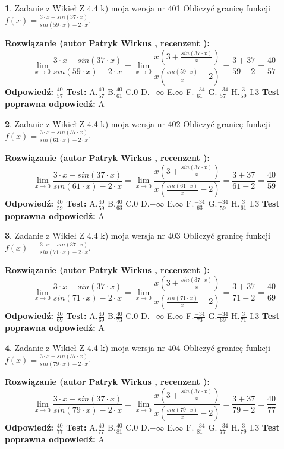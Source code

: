 \documentclass[12pt, a4paper]{article}
\theoremstyle{definition} %
\newtheorem{zad}{}
\newcommand{\zadStart}[1]{\begin{zad}#1\newline}
\newcommand{\zadStop}{\end{zad}}
\newcommand{\rozwStart}[2]{\noindent \textbf{Rozwiązanie (autor #1 , recenzent #2): }\newline}
\newcommand{\rozwStop}{\newline}
\newcommand{\odpStart}{\noindent \textbf{Odpowiedź:}\newline}
\newcommand{\odpStop}{\newline}
\newcommand{\testStart}{\noindent \textbf{Test:}\newline}
\newcommand{\testStop}{\newline}
\newcommand{\kluczStart}{\noindent \textbf{Test poprawna odpowiedź:}\newline}
\newcommand{\kluczStop}{\newline}
\begin{document}
\zadStart{Zadanie z Wikieł Z 4.4 k) moja wersja nr 401}
Obliczyć granicę funkcji $f(x)=\frac{3\cdot x +sin(37\cdot x)}{sin(59\cdot x) -2\cdot x}$.
\zadStop
\rozwStart{Patryk Wirkus}{}
$$\lim\limits_{x\to 0}\frac{3\cdot x +sin(37\cdot x)}{sin(59\cdot x) -2\cdot x}
=\lim\limits_{x\to 0}\frac{x(3+\frac{sin(37\cdot x)}{x})}{x(\frac{sin(59\cdot x)}{x}-2)}
=\frac{3+37}{59-2} = \frac{40}{57}$$
\rozwStop
\odpStart
$\frac{40}{57}$
\odpStop
\testStart
A.$\frac{40}{57}$
B.$\frac{40}{61}$
C.$0$
D.$-\infty$
E.$\infty$
F.$\frac{-34}{61}$
G.$\frac{-34}{57}$
H.$\frac{3}{59}$
I.$3$
\testStop
\kluczStart
A
\kluczStop



\zadStart{Zadanie z Wikieł Z 4.4 k) moja wersja nr 402}
Obliczyć granicę funkcji $f(x)=\frac{3\cdot x +sin(37\cdot x)}{sin(61\cdot x) -2\cdot x}$.
\zadStop
\rozwStart{Patryk Wirkus}{}
$$\lim\limits_{x\to 0}\frac{3\cdot x +sin(37\cdot x)}{sin(61\cdot x) -2\cdot x}
=\lim\limits_{x\to 0}\frac{x(3+\frac{sin(37\cdot x)}{x})}{x(\frac{sin(61\cdot x)}{x}-2)}
=\frac{3+37}{61-2} = \frac{40}{59}$$
\rozwStop
\odpStart
$\frac{40}{59}$
\odpStop
\testStart
A.$\frac{40}{59}$
B.$\frac{40}{63}$
C.$0$
D.$-\infty$
E.$\infty$
F.$\frac{-34}{63}$
G.$\frac{-34}{59}$
H.$\frac{3}{61}$
I.$3$
\testStop
\kluczStart
A
\kluczStop



\zadStart{Zadanie z Wikieł Z 4.4 k) moja wersja nr 403}
Obliczyć granicę funkcji $f(x)=\frac{3\cdot x +sin(37\cdot x)}{sin(71\cdot x) -2\cdot x}$.
\zadStop
\rozwStart{Patryk Wirkus}{}
$$\lim\limits_{x\to 0}\frac{3\cdot x +sin(37\cdot x)}{sin(71\cdot x) -2\cdot x}
=\lim\limits_{x\to 0}\frac{x(3+\frac{sin(37\cdot x)}{x})}{x(\frac{sin(71\cdot x)}{x}-2)}
=\frac{3+37}{71-2} = \frac{40}{69}$$
\rozwStop
\odpStart
$\frac{40}{69}$
\odpStop
\testStart
A.$\frac{40}{69}$
B.$\frac{40}{73}$
C.$0$
D.$-\infty$
E.$\infty$
F.$\frac{-34}{73}$
G.$\frac{-34}{69}$
H.$\frac{3}{71}$
I.$3$
\testStop
\kluczStart
A
\kluczStop



\zadStart{Zadanie z Wikieł Z 4.4 k) moja wersja nr 404}
Obliczyć granicę funkcji $f(x)=\frac{3\cdot x +sin(37\cdot x)}{sin(79\cdot x) -2\cdot x}$.
\zadStop
\rozwStart{Patryk Wirkus}{}
$$\lim\limits_{x\to 0}\frac{3\cdot x +sin(37\cdot x)}{sin(79\cdot x) -2\cdot x}
=\lim\limits_{x\to 0}\frac{x(3+\frac{sin(37\cdot x)}{x})}{x(\frac{sin(79\cdot x)}{x}-2)}
=\frac{3+37}{79-2} = \frac{40}{77}$$
\rozwStop
\odpStart
$\frac{40}{77}$
\odpStop
\testStart
A.$\frac{40}{77}$
B.$\frac{40}{81}$
C.$0$
D.$-\infty$
E.$\infty$
F.$\frac{-34}{81}$
G.$\frac{-34}{77}$
H.$\frac{3}{79}$
I.$3$
\testStop
\kluczStart
A
\kluczStop
\end{document}
